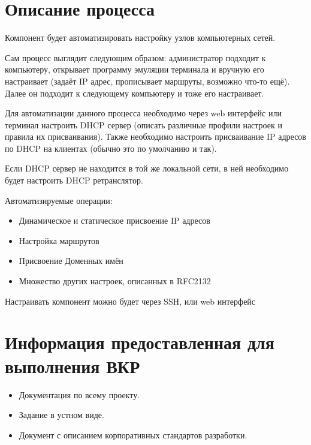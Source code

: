 \documentclass[12pt]{article}
\begin{document}
\section{Описание процесса}
Компонент будет автоматизировать настройку узлов компьютерных сетей.

Сам процесс выглядит следующим образом:
администратор подходит к компьютеру, открывает программу эмуляции терминала и вручную его настраивает (задаёт IP адрес, прописывает маршруты, возможно что-то ещё). Далее он подходит к следующему компьютеру и тоже его настраивает.

Для автоматизации данного процесса необходимо через web интерфейс или терминал настроить DHCP сервер (описать различные профили настроек и правила их присваивания). Также необходимо настроить присваивание IP адресов по DHCP на клиентах (обычно это по умолчанию и так).

Если DHCP сервер не находится в той же локальной сети, в ней необходимо будет настроить DHCP ретранслятор.


Автоматизируемые операции:
\begin{itemize}
    \item Динамическое и статическое присвоение IP адресов
    \item Настройка маршрутов
    \item Присвоение Доменных имён
    \item Множество других настроек, описанных в RFC2132
\end{itemize}

Настраивать компонент можно будет через SSH, или web интерфейс

\section{Информация предоставленная для выполнения ВКР}
\begin{itemize}
    \item Документация по всему проекту.
    \item Задание в устном виде.
    \item Документ с описанием корпоративных стандартов разработки.
\end{itemize}

\end{document}

